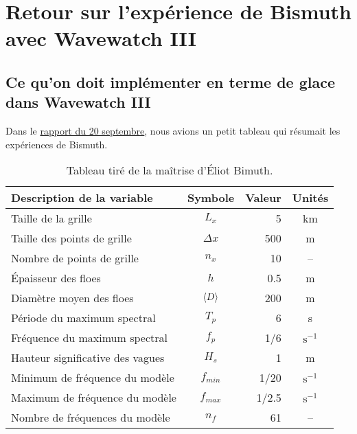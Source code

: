 \documentclass[10pt]{article}
\numberwithin{equation}{section}
\begin{document}
\section{Retour sur l'expérience de Bismuth avec Wavewatch III}
\label{sec:org717717b}

\subsection{Ce qu'on doit implémenter en terme de glace dans Wavewatch III}
\label{sec:org6693ef6}

Dans le \href{Fichiers\_pdf/rapport-2024-09-20.pdf}{rapport du 20 septembre}, nous avions un petit tableau qui résumait les expériences de Bismuth.

\begin{table}[!h]
\caption{\label{tab:org2298faf}Tableau tiré de la maîtrise d'Éliot Bimuth.}
\centering
\begin{tabular}{lcrc}
\hline
\hline
Description de la variable & Symbole & Valeur & Unités\\
\hline
Taille de la grille & \(L_x\) & 5 & km\\
Taille des points de grille & \(\Delta x\) & 500 & m\\
Nombre de points de grille & \(n_x\) & 10 & --\\
Épaisseur des floes & \(h\) & 0.5 & m\\
Diamètre moyen des floes & \(\expval{D}\) & 200 & m\\
Période du maximum spectral & \(T_p\) & 6 & s\\
Fréquence du maximum spectral & \(f_p\) & 1/6 & \(\mathrm{s}^{-1}\)\\
Hauteur significative des vagues & \(H_s\) & 1 & m\\
Minimum de fréquence du modèle & \(f_{min}\) & 1/20 & \(\mathrm{s}^{-1}\)\\
Maximum de fréquence du modèle & \(f_{max}\) & 1/2.5 & \(\mathrm{s}^{-1}\)\\
Nombre de fréquences du modèle & \(n_f\) & 61 & --\\
\hline
\end{tabular}
\end{table}
\end{document}
